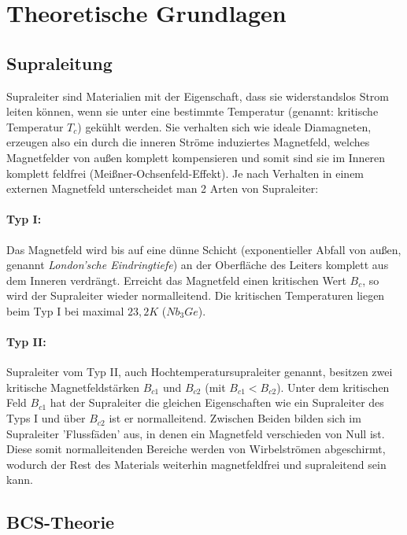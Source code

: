 \section{Theoretische Grundlagen}

\subsection{Supraleitung}

Supraleiter sind Materialien mit der Eigenschaft, dass sie widerstandslos Strom leiten können, wenn sie unter eine bestimmte Temperatur (genannt: kritische Temperatur $T_c$) gekühlt werden. Sie verhalten sich wie ideale Diamagneten, erzeugen also ein durch die inneren Ströme induziertes Magnetfeld, welches Magnetfelder von außen komplett kompensieren und somit sind sie im Inneren komplett feldfrei (Meißner-Ochsenfeld-Effekt). Je nach Verhalten in einem externen Magnetfeld unterscheidet man 2 Arten von Supraleiter:

\paragraph{Typ I: }  Das Magnetfeld wird bis auf eine dünne Schicht (exponentieller Abfall von außen, genannt \emph{London'sche Eindringtiefe}) an der Oberfläche des Leiters komplett aus dem Inneren verdrängt. Erreicht das Magnetfeld einen kritischen Wert $B_c$, so wird der Supraleiter wieder normalleitend. Die kritischen Temperaturen liegen beim Typ I bei maximal $23,2K$ ($Nb_3Ge$).

\paragraph{Typ II: } Supraleiter vom Typ II, auch Hochtemperatursupraleiter genannt, besitzen zwei kritische Magnetfeldstärken $B_{c1}$ und $B_{c2}$ (mit $B_{c1} < B_{c2}$). Unter dem kritischen Feld $B_{c1}$ hat der Supraleiter die gleichen Eigenschaften wie ein Supraleiter des Typs I und über $B_{c2}$ ist er normalleitend. Zwischen Beiden bilden sich im Supraleiter 'Flussfäden' aus, in denen ein Magnetfeld verschieden von Null ist. Diese somit normalleitenden Bereiche werden von Wirbelströmen abgeschirmt, wodurch der Rest des Materials weiterhin magnetfeldfrei und supraleitend sein kann.

\subsection{BCS-Theorie}

